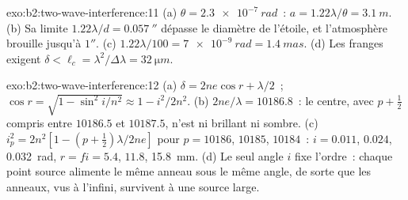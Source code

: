 \begin{solution}{exo:b2:two-wave-interference:11}
(a) $\theta = \qty{2.3e-7}{rad}$~: $a = 1.22\lambda/\theta = \qty{3.1}{m}$. (b) Sa limite $1.22\lambda/d =
\qty{0.057}{''}$ dépasse le diamètre de l'étoile, et l'atmosphère brouille
jusqu'à $1''$. (c) $1.22\lambda/100 = \qty{7e-9}{rad} = \qty{1.4}{mas}$. (d) Les franges exigent
$\delta < \ell_c = \lambda^2/\Delta\lambda = \qty{32}{\micro m}$.
\end{solution}

\begin{solution}{exo:b2:two-wave-interference:12}
(a) $\delta = 2ne\cos r + \lambda/2$~; $\cos r = \sqrt{1 - \sin^2i/n^2} \approx 1 - i^2/2n^2$.
(b) $2ne/\lambda = 10186.8$~: le centre, avec $p + \tfrac12$ compris entre $10186.5$ et
$10187.5$, n'est ni brillant ni sombre. (c) $i_p^2 = 2n^2[1 - (p + \tfrac12)\lambda/
2ne]$ pour $p = 10186$, $10185$, $10184$~: $i = 0.011$, $0.024$, \qty{0.032}{rad}, $r = fi
= 5.4$, $11.8$, \qty{15.8}{mm}. (d) Le seul angle $i$ fixe l'ordre~: chaque
point source alimente le même anneau sous le même angle, de sorte que les anneaux, vus
à l'infini, survivent à une source large.
\end{solution}

